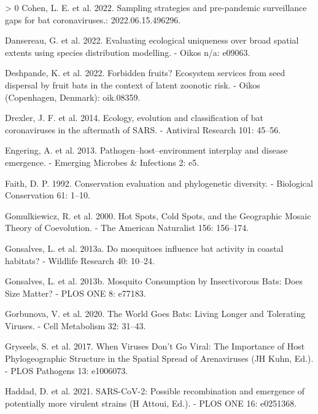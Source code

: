 \documentclass[11pt]{article}
\newlength{\cslhangindent}
\newenvironment{CSLReferences}[3] %
 {%
  \setlength{\parindent}{0pt}
  \ifodd #1 \everypar{\setlength{\hangindent}{\cslhangindent}}\ignorespaces\fi
  \ifnum #2 > 0
  \setlength{\parskip}{#2\baselineskip}
  \fi
 }%
 {}
\begin{document}
\begin{CSLReferences}{1}{0}
\leavevmode\hypertarget{ref-Cohen2022SamStr}{}%
Cohen, L. E. et al. 2022. Sampling strategies and pre-pandemic
surveillance gaps for bat coronaviruses.: 2022.06.15.496296.

\leavevmode\hypertarget{ref-Dansereau2022EvaEco}{}%
Dansereau, G. et al. 2022. Evaluating ecological uniqueness over broad
spatial extents using species distribution modelling. - Oikos n/a:
e09063.

\leavevmode\hypertarget{ref-Deshpande2022ForFru}{}%
Deshpande, K. et al. 2022. Forbidden fruits? Ecosystem services from
seed dispersal by fruit bats in the context of latent zoonotic risk. -
Oikos (Copenhagen, Denmark): oik.08359.

\leavevmode\hypertarget{ref-Drexler2014EcoEvo}{}%
Drexler, J. F. et al. 2014. Ecology, evolution and classification of bat
coronaviruses in the aftermath of SARS. - Antiviral Research 101:
45--56.

\leavevmode\hypertarget{ref-Engering2013PatHos}{}%
Engering, A. et al. 2013. Pathogen--host--environment interplay and
disease emergence. - Emerging Microbes \& Infections 2: e5.

\leavevmode\hypertarget{ref-Faith1992ConEva}{}%
Faith, D. P. 1992. Conservation evaluation and phylogenetic diversity. -
Biological Conservation 61: 1--10.

\leavevmode\hypertarget{ref-Gomulkiewicz2000HotSpo}{}%
Gomulkiewicz, R. et al. 2000. Hot Spots, Cold Spots, and the Geographic
Mosaic Theory of Coevolution. - The American Naturalist 156: 156--174.

\leavevmode\hypertarget{ref-Gonsalves2013MosInf}{}%
Gonsalves, L. et al. 2013a. Do mosquitoes influence bat activity in
coastal habitats? - Wildlife Research 40: 10--24.

\leavevmode\hypertarget{ref-Gonsalves2013MosCon}{}%
Gonsalves, L. et al. 2013b. Mosquito Consumption by Insectivorous Bats:
Does Size Matter? - PLOS ONE 8: e77183.

\leavevmode\hypertarget{ref-Gorbunova2020WorGoe}{}%
Gorbunova, V. et al. 2020. The World Goes Bats: Living Longer and
Tolerating Viruses. - Cell Metabolism 32: 31--43.

\leavevmode\hypertarget{ref-Gryseels2017WheVir}{}%
Gryseels, S. et al. 2017. When Viruses Don't Go Viral: The Importance of
Host Phylogeographic Structure in the Spatial Spread of Arenaviruses (JH
Kuhn, Ed.). - PLOS Pathogens 13: e1006073.

\leavevmode\hypertarget{ref-Haddad2021SarPos}{}%
Haddad, D. et al. 2021. SARS-CoV-2: Possible recombination and emergence
of potentially more virulent strains (H Attoui, Ed.). - PLOS ONE 16:
e0251368.


\end{CSLReferences}
\end{document}

